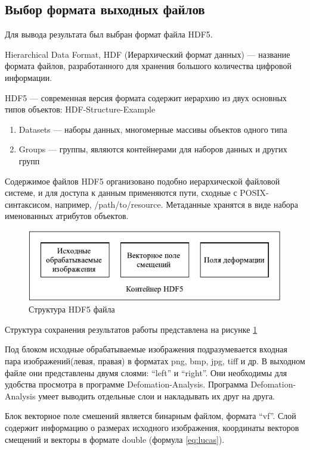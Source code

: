 \subsection {Выбор формата выходных файлов}
Для вывода результата был выбран формат файла HDF5. 

Hierarchical Data Format, HDF (Иерархический формат данных) — название формата файлов, разработанного для хранения большого количества цифровой информации.

HDF5 — современная версия формата содержит иерархию из двух основных типов объектов:
HDF-Structure-Example
\begin{enumerate}
\item Datasets — наборы данных, многомерные массивы объектов одного типа
\item Groups — группы, являются контейнерами для наборов данных и других групп
\end{enumerate}
    
Содержимое файлов HDF5 организовано подобно иерархической файловой системе, и для доступа к данным применяются пути, сходные с POSIX-синтаксисом, например, /path/to/resource. Метаданные хранятся в виде набора именованных атрибутов объектов.\cite{hdf5}
\begin{figure}
\centering
\includegraphics[width=0.7\linewidth]{images/structHDF5.pdf}
\caption{Структура HDF5 файла}
\label{fig:structHDF5}
\end{figure}

Структура сохранения результатов работы представлена на рисунке \ref{fig:structHDF5}

Под блоком исходные обрабатываемые изображения подразумевается входная пара изображений(левая, правая) в форматах png, bmp, jpg, tiff и др. В выходном файле они представлены двумя слоями: ``left'' и ``right''. Они необходимы для удобства просмотра в программе Defomation-Analysis. Программа Defomation-Analysis умеет выводить отдельные слои и накладывать их друг на друга.

Блок векторное поле смешений является бинарным файлом, формата ``vf''. Слой содержит информацию о размерах исходного изображения, координаты векторов смещений и векторы в формате double (формула \ref{eq:lucas}).


